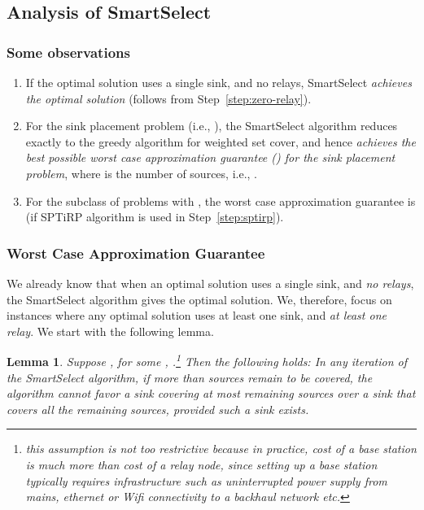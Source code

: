\documentclass[conference]{IEEEtran}
\newtheorem{lemma}{Lemma}
\begin{document}
\subsection{Analysis of SmartSelect}
\subsubsection{Some observations}

\begin{enumerate}
\item If the optimal solution uses a single sink, and no relays, SmartSelect \emph{achieves the optimal solution} (follows from Step~\ref{step:zero-relay}).
\item For the sink placement problem (i.e., ), the SmartSelect algorithm reduces exactly to the greedy algorithm for weighted set cover, and hence \emph{achieves the best possible worst case approximation guarantee () for the sink placement problem}, where  is the number of sources, i.e., .
\item For the subclass of problems with , the worst case approximation guarantee is  (if SPTiRP algorithm is used in Step~\ref{step:sptirp}).
\end{enumerate}

\subsubsection{Worst Case Approximation Guarantee}
We already know that when an optimal solution uses a single sink, and \emph{no relays}, the SmartSelect algorithm gives the optimal solution. We, therefore, focus on instances where any optimal solution uses at least one sink, and \emph{at least one relay}. We start with the following lemma.

\begin{lemma}
\label{lem:greedy-lemma}
Suppose , for some , .\footnote{this assumption is not too restrictive because in practice, cost of a base station is much more than cost of a relay node, since setting up a base station typically requires infrastructure such as uninterrupted power supply from mains, ethernet or Wifi connectivity to a backhaul network etc.} Then the following holds: In any iteration of the SmartSelect algorithm, if more than  sources remain to be covered, the algorithm cannot favor a sink covering at most  remaining sources over a sink that covers \emph{all} the remaining sources, provided such a sink exists.
\end{lemma}
\end{document}
